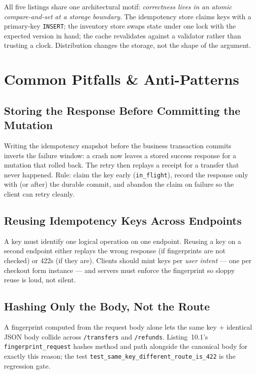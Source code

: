 \begin{keyconceptbox}
All five listings share one architectural motif: \emph{correctness lives in
an atomic compare-and-set at a storage boundary}. The idempotency store
claims keys with a primary-key \texttt{INSERT}; the inventory store swaps
state under one lock with the expected version in hand; the cache revalidates
against a validator rather than trusting a clock. Distribution changes the
storage, not the shape of the argument.
\end{keyconceptbox}

\section{Common Pitfalls \& Anti-Patterns}
\label{sec:ch10-pitfalls}

\subsection{Storing the Response Before Committing the Mutation}
Writing the idempotency snapshot before the business transaction commits
inverts the failure window: a crash now leaves a stored success response for
a mutation that rolled back. The retry then replays a receipt for a transfer
that never happened. Rule: claim the key early (\texttt{in\_flight}), record
the response only with (or after) the durable commit, and abandon the claim
on failure so the client can retry cleanly.

\subsection{Reusing Idempotency Keys Across Endpoints}
A key must identify one logical operation on one endpoint. Reusing a key on
a second endpoint either replays the wrong response (if fingerprints are not
checked) or 422s (if they are). Clients should mint keys per
\emph{user intent} --- one per checkout form instance --- and servers must
enforce the fingerprint so sloppy reuse is loud, not silent.

\subsection{Hashing Only the Body, Not the Route}
A fingerprint computed from the request body alone lets the same key +
identical JSON body collide across \texttt{/transfers} and
\texttt{/refunds}. Listing~10.1's \texttt{fingerprint\_request} hashes
method and path alongside the canonical body for exactly this reason; the
test \texttt{test\_same\_key\_different\_route\_is\_422} is the regression
gate.

